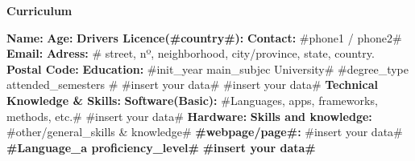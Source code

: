 \documentclass[a4paper,10pt]{report}
\begin{document}
\pagestyle{empty}
\begin{center}
  \huge
  \vspace*{-1.5cm}
  \textbf{Curriculum}
  \vspace*{.5\baselineskip}
  \end{center}
  \begin{flushleft}
  \textbf{Name:} 
  \linebreak
  \textbf{Age:} 
  \textbf{Drivers Licence(#country#):} 
  \linebreak
  \textbf{Contact:} #phone1 / phone2#
  \linebreak
  \textbf{Email:} 
  \textbf{Adress:} # street, nº, neighborhood, city/province, state, country.
  \textbf{Postal Code:} 
  \linebreak
  \linebreak
  \textbf{Education:}
  \vspace*{0.5\baselineskip}
  \linebreak
  #init_year main_subjec University#
  \linebreak
  #degree_type attended_semesters #
  \vspace*{0.5\baselineskip}
  \linebreak
  #insert your data#
  \linebreak
  #insert your data#
  \linebreak
  \linebreak
  \textbf{Technical Knowledge \& Skills:}
  \vspace*{0.5\baselineskip}
  \linebreak
  \textbf{Software(Basic):} #Languages, apps, frameworks, methods, etc.# 
  \linebreak
  #insert your data#
  \vspace*{0.25\baselineskip}
  \linebreak
  \textbf{Hardware:} 
  \vspace*{0.25\baselineskip}
  \linebreak
  \textbf{Skills and knowledge:} #other/general_skills & knowledge#
  \vspace*{0.25\baselineskip}
  \linebreak
  \textbf{#webpage/page#:} #insert your data#
  \vspace*{0.25\baselineskip}
  \linebreak
   \textbf{#Language_a proficiency_level#}
   \linebreak
   \textbf{#insert your data#}
   \linebreak

\end{flushleft}
\end{document}
